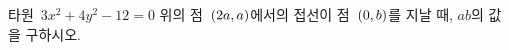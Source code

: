 타원~$3x^2+4y^2-12=0$ 위의 점~$(2a{,}\mkern3mu\mathopen{}a)$에서의 접선이 점~$(0{,}\mkern3mu\mathopen{}b)$를 지날 때, $ab$의 값을 구하시오. 
